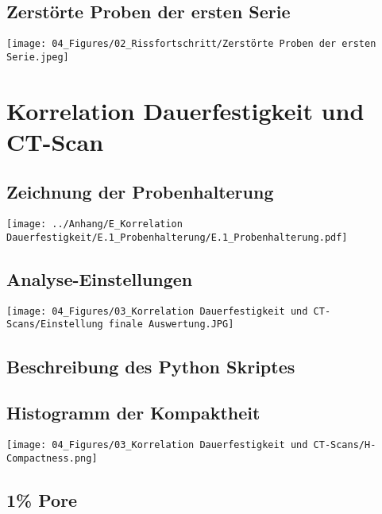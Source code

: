   \subsection{Zerstörte Proben der ersten Serie}
    \label{Zerstörte Proben der ersten Serie}
    \begin{center}
      \texttt{[image: 04\_Figures/02\_Rissfortschritt/Zerstörte Proben der ersten Serie.jpeg]}
    \end{center}

\section{Korrelation Dauerfestigkeit und CT-Scan}
  \subsection{Zeichnung der Probenhalterung}
    \label{Zeichnung der Probenhalterung}
    \texttt{[image: ../Anhang/E\_Korrelation Dauerfestigkeit/E.1\_Probenhalterung/E.1\_Probenhalterung.pdf]}


  \subsection{Analyse-Einstellungen}
    \label{Analyse-Einstellungen}
    \begin{center}
      \texttt{[image: 04\_Figures/03\_Korrelation Dauerfestigkeit und CT-Scans/Einstellung finale Auswertung.JPG]}
    \end{center}

  \subsection{Beschreibung des Python Skriptes}
  \label{Beschreibung des Python Scriptes}

  

  \subsection{Histogramm der Kompaktheit}
    \label{Histogramm der Kompaktheit}
    \begin{center}
      \texttt{[image: 04\_Figures/03\_Korrelation Dauerfestigkeit und CT-Scans/H-Compactness.png]}
    \end{center}

  \subsection{1\% Pore}
